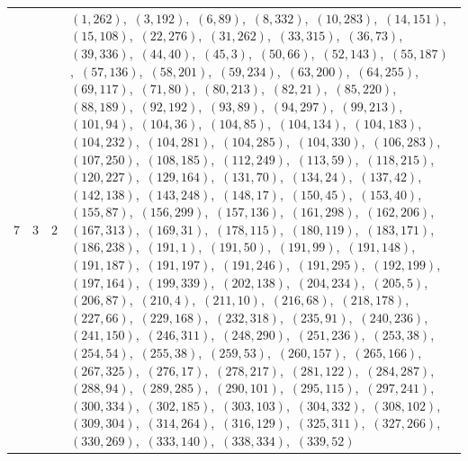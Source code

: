 \documentclass[11pt]{article}
\begin{document}
\begin{longtable}{@{}rrl>{\raggedright\arraybackslash}p{}@{}}
7 & 3 & $2$ & $(1,262)$,\allowbreak\ $(3,192)$,\allowbreak\ $(6,89)$,\allowbreak\ $(8,332)$,\allowbreak\ $(10,283)$,\allowbreak\ $(14,151)$,\allowbreak\ $(15,108)$,\allowbreak\ $(22,276)$,\allowbreak\ $(31,262)$,\allowbreak\ $(33,315)$,\allowbreak\ $(36,73)$,\allowbreak\ $(39,336)$,\allowbreak\ $(44,40)$,\allowbreak\ $(45,3)$,\allowbreak\ $(50,66)$,\allowbreak\ $(52,143)$,\allowbreak\ $(55,187)$,\allowbreak\ $(57,136)$,\allowbreak\ $(58,201)$,\allowbreak\ $(59,234)$,\allowbreak\ $(63,200)$,\allowbreak\ $(64,255)$,\allowbreak\ $(69,117)$,\allowbreak\ $(71,80)$,\allowbreak\ $(80,213)$,\allowbreak\ $(82,21)$,\allowbreak\ $(85,220)$,\allowbreak\ $(88,189)$,\allowbreak\ $(92,192)$,\allowbreak\ $(93,89)$,\allowbreak\ $(94,297)$,\allowbreak\ $(99,213)$,\allowbreak\ $(101,94)$,\allowbreak\ $(104,36)$,\allowbreak\ $(104,85)$,\allowbreak\ $(104,134)$,\allowbreak\ $(104,183)$,\allowbreak\ $(104,232)$,\allowbreak\ $(104,281)$,\allowbreak\ $(104,285)$,\allowbreak\ $(104,330)$,\allowbreak\ $(106,283)$,\allowbreak\ $(107,250)$,\allowbreak\ $(108,185)$,\allowbreak\ $(112,249)$,\allowbreak\ $(113,59)$,\allowbreak\ $(118,215)$,\allowbreak\ $(120,227)$,\allowbreak\ $(129,164)$,\allowbreak\ $(131,70)$,\allowbreak\ $(134,24)$,\allowbreak\ $(137,42)$,\allowbreak\ $(142,138)$,\allowbreak\ $(143,248)$,\allowbreak\ $(148,17)$,\allowbreak\ $(150,45)$,\allowbreak\ $(153,40)$,\allowbreak\ $(155,87)$,\allowbreak\ $(156,299)$,\allowbreak\ $(157,136)$,\allowbreak\ $(161,298)$,\allowbreak\ $(162,206)$,\allowbreak\ $(167,313)$,\allowbreak\ $(169,31)$,\allowbreak\ $(178,115)$,\allowbreak\ $(180,119)$,\allowbreak\ $(183,171)$,\allowbreak\ $(186,238)$,\allowbreak\ $(191,1)$,\allowbreak\ $(191,50)$,\allowbreak\ $(191,99)$,\allowbreak\ $(191,148)$,\allowbreak\ $(191,187)$,\allowbreak\ $(191,197)$,\allowbreak\ $(191,246)$,\allowbreak\ $(191,295)$,\allowbreak\ $(192,199)$,\allowbreak\ $(197,164)$,\allowbreak\ $(199,339)$,\allowbreak\ $(202,138)$,\allowbreak\ $(204,234)$,\allowbreak\ $(205,5)$,\allowbreak\ $(206,87)$,\allowbreak\ $(210,4)$,\allowbreak\ $(211,10)$,\allowbreak\ $(216,68)$,\allowbreak\ $(218,178)$,\allowbreak\ $(227,66)$,\allowbreak\ $(229,168)$,\allowbreak\ $(232,318)$,\allowbreak\ $(235,91)$,\allowbreak\ $(240,236)$,\allowbreak\ $(241,150)$,\allowbreak\ $(246,311)$,\allowbreak\ $(248,290)$,\allowbreak\ $(251,236)$,\allowbreak\ $(253,38)$,\allowbreak\ $(254,54)$,\allowbreak\ $(255,38)$,\allowbreak\ $(259,53)$,\allowbreak\ $(260,157)$,\allowbreak\ $(265,166)$,\allowbreak\ $(267,325)$,\allowbreak\ $(276,17)$,\allowbreak\ $(278,217)$,\allowbreak\ $(281,122)$,\allowbreak\ $(284,287)$,\allowbreak\ $(288,94)$,\allowbreak\ $(289,285)$,\allowbreak\ $(290,101)$,\allowbreak\ $(295,115)$,\allowbreak\ $(297,241)$,\allowbreak\ $(300,334)$,\allowbreak\ $(302,185)$,\allowbreak\ $(303,103)$,\allowbreak\ $(304,332)$,\allowbreak\ $(308,102)$,\allowbreak\ $(309,304)$,\allowbreak\ $(314,264)$,\allowbreak\ $(316,129)$,\allowbreak\ $(325,311)$,\allowbreak\ $(327,266)$,\allowbreak\ $(330,269)$,\allowbreak\ $(333,140)$,\allowbreak\ $(338,334)$,\allowbreak\ $(339,52)$\\

\end{longtable}
\end{document}
